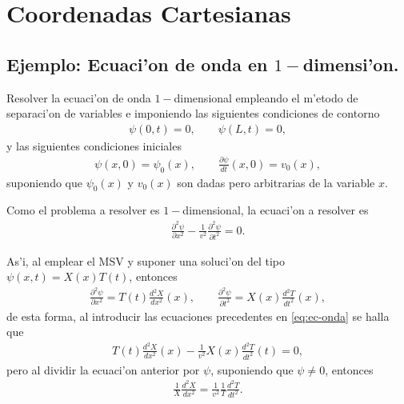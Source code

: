 \section{Coordenadas Cartesianas}
\subsection{Ejemplo: Ecuaci'on de onda en $1-$dimensi'on.}
Resolver la ecuaci'on de onda $1-$dimensional empleando el m'etodo de separaci'on de variables e imponiendo las siguientes condiciones de contorno 
\begin{align}
\psi(0,t)=0,\qquad \psi(L,t)=0,\label{eq:cond-borde}
\end{align}
y las siguientes condiciones iniciales 
\begin{align}
\psi(x,0)=\psi_{0}(x),\qquad \frac{\partial \psi}{dt}(x,0)=v_{0}(x),\label{eq:cond-inicial}
\end{align}
suponiendo que $\psi_{0}(x)$ y $v_{0}(x)$ son dadas pero arbitrarias de la variable $x$.

Como el problema a resolver es $1-$dimensional, la ecuaci'on a resolver es
\begin{align}
\frac{\partial^2 \psi}{\partial x^2}-\frac{1}{v^2}\frac{\partial^2 \psi}{\partial t^2}=0.\label{eq:ec-onda}
\end{align}

As'i, al emplear el MSV y suponer una soluci'on del tipo $\psi(x,t)=X(x)T(t)$, entonces
\begin{align}
\frac{\partial^2 \psi}{\partial x^2}=T(t) \frac{d^2X}{dx^2}(x),\qquad \frac{\partial^2 \psi}{\partial t^2}=X(x) \frac{d^2 T}{dt^2}(x),
\end{align}
de esta forma, al introducir las ecuaciones precedentes en \eqref{eq:ec-onda} se halla que
\begin{align}
T(t) \frac{d^2X}{dx^2}(x)-\frac{1}{v^2}X(x) \frac{d^2 T}{dt^2}(t)=0,
\end{align}
pero al dividir la ecuaci'on anterior por $\psi$, suponiendo que $\psi \neq 0$, entonces
\begin{align}
\frac{1}{X}\frac{d^2 X}{dx^2}=\frac{1}{v^2}\frac{1}{T}\frac{d^2 T}{dt^2}.\label{eq:ec-separable}
\end{align} 

